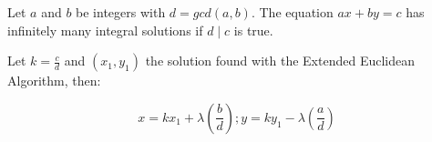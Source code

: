 Let $a$ and $b$ be integers with $d = gcd(a, b)$. The equation $ax + by = c$ has infinitely many integral solutions if $d \mid c$ is true.

Let $k = \frac{c}{d}$ and $(x_{1}, y_{1})$ the solution found with the Extended Euclidean Algorithm, then:

$$ x = k x_{1} + \lambda (\frac{b}{d}); y = k y_{1} - \lambda (\frac{a}{d}) $$